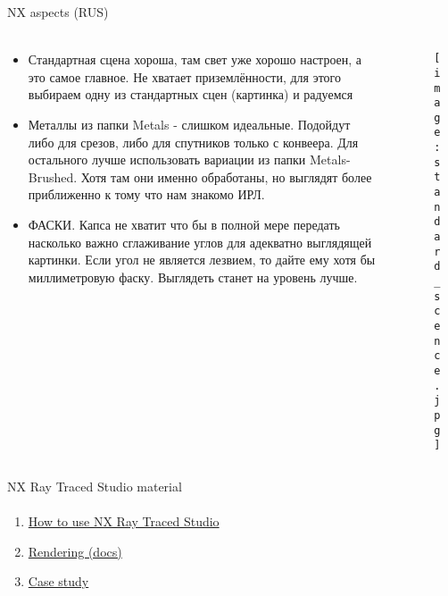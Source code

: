 \documentclass[aspectratio=169]{beamer}
\begin{document}
\begin{frame}[t]{NX aspects (RUS)}
\framesubtitle{}
\begin{columns}[T,onlytextwidth]
    \begin{column}{0.69\textwidth}
        \begin{itemize}
            \scriptsize
            \item Стандартная сцена хороша, там свет уже хорошо настроен, а это самое главное. Не хватает приземлённости, для этого выбираем одну из стандартных сцен (картинка) и радуемся
            \item Металлы из папки Metals - слишком идеальные. Подойдут либо для срезов, либо для спутников только с конвеера. Для остального лучше использовать вариации из папки Metals-Brushed. Хотя там они именно обработаны, но выглядят более приближенно к тому что нам знакомо ИРЛ.
            \item ФАСКИ. Капса не хватит что бы в полной мере передать насколько важно сглаживание углов для адекватно выглядящей картинки. Если угол не является лезвием, то дайте ему хотя бы миллиметровую фаску. Выглядеть станет на уровень лучше.
        \end{itemize}
    \end{column}
    \begin{column}{0.29\textwidth}
        \begin{figure}[H]
            \centering\texttt{[image: standard\_scence.jpg]}
            \label{fig:standard_scence.jpg}
        \end{figure}
    \end{column}
\end{columns}
\end{frame}

\begin{frame}[t]{NX Ray Traced Studio material}
\framesubtitle{}
    \begin{enumerate}
        \item \href{https://youtu.be/uyGHuxEY5Gk}{How to use NX Ray Traced Studio}
        \item \href{https://docs.sw.siemens.com/en-US/doc/209349590/PL20200605195244930.viewing_rendering/xid1219739}{Rendering (docs)}
        \item \href{https://youtu.be/qPT449FupKU}{Case study}
    \end{enumerate}
\end{frame}
\end{document}
